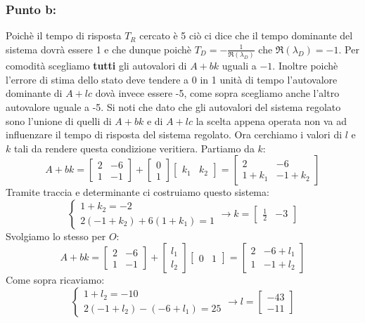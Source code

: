 \documentclass[a4paper]{report}
\begin{document}
\subsubsection*{Punto b:}
Poichè il tempo di risposta $T_R$ cercato è 5 ciò ci dice che il tempo dominante del sistema dovrà essere 1 e che dunque poichè $T_D=-\frac{1}{\Re(\lambda_D)}$ che $\Re(\lambda_D)=-1$. Per comodità scegliamo \textbf{tutti} gli autovalori di $A+bk$ uguali a $-1$. Inoltre poichè l'errore di stima dello stato deve tendere a $0$ in 1 unità di tempo l'autovalore dominante di $A+lc$ dovà invece essere -5, come sopra scegliamo anche l'altro autovalore uguale a -5. Si noti che dato che gli autovalori del sistema regolato sono l'unione di quelli di $A+bk$ e di $A+lc$ la scelta appena operata non va ad influenzare il tempo di risposta del sistema regolato. \newline
Ora cerchiamo i valori di $l$ e $k$ tali da rendere questa condizione veritiera. Partiamo da $k$:
\[
A+bk=\begin{bmatrix}
2 & -6\\
1 & -1
\end{bmatrix} + \begin{bmatrix}
0\\ 1
\end{bmatrix} \begin{bmatrix}
k_1 & k_2
\end{bmatrix}= \begin{bmatrix}
2 & -6\\
1+k_1 & -1+k_2
\end{bmatrix}
\]
Tramite traccia e determinante ci costruiamo questo sistema:
\[
\left\{\begin{array}{l}
1+k_2=-2\\
2(-1+k_2)+6(1+k_1)=1
\end{array}\right.\longrightarrow k=\begin{bmatrix}
\frac{1}{2} & -3
\end{bmatrix}
\]
Svolgiamo lo stesso per $O$:
\[
A+bk=\begin{bmatrix}
2 & -6\\
1 & -1
\end{bmatrix} + \begin{bmatrix}
l_1 \\ l_2
\end{bmatrix} \begin{bmatrix}
0 & 1
\end{bmatrix}= \begin{bmatrix}
2 & -6+l_1\\
1 & -1+l_2
\end{bmatrix}
\]
Come sopra ricaviamo:
\[
\left\{\begin{array}{l}
1+l_2=-10\\
2(-1+l_2)-(-6+l_1)=25
\end{array}\right.\longrightarrow l=\begin{bmatrix}
-43\\
-11
\end{bmatrix}
\]
\end{document}
